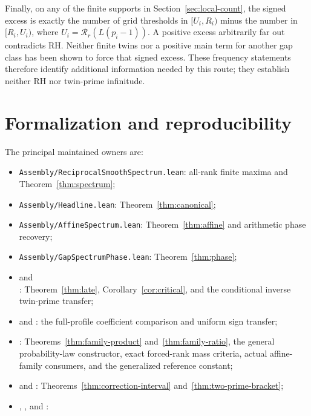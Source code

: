 \documentclass[11pt]{article}
\theoremstyle{definition}
\begin{document}
Finally, on any of the finite supports in Section~\ref{sec:local-count},
the signed excess is exactly the number of grid thresholds in
$[U_i,R_i)$ minus the number in $[R_i,U_i)$, where
$U_i=\mathcal R_r(L(p_i-1))$.
A positive excess arbitrarily far out contradicts RH.
Neither finite twins nor a positive main term for another gap class
has been shown to force that signed excess. These frequency statements
therefore identify additional information needed by this route;
they establish neither RH nor twin-prime infinitude.

\section{Formalization and reproducibility}\label{sec:formal}
The principal maintained owners are:
\begin{itemize}\small\raggedright
\item \texttt{Assembly/ReciprocalSmoothSpectrum.lean}:
all-rank finite maxima and Theorem~\ref{thm:spectrum};
\item \texttt{Assembly/Headline.lean}: Theorem~\ref{thm:canonical};
\item \texttt{Assembly/AffineSpectrum.lean}:
Theorem~\ref{thm:affine} and arithmetic phase recovery;
\item \texttt{Assembly/GapSpectrumPhase.lean}:
Theorem~\ref{thm:phase};
\item {} and\\
:
Theorem~\ref{thm:late}, Corollary~\ref{cor:critical}, and the
conditional inverse twin-prime transfer;
\item {} and
: the full-profile
coefficient comparison and uniform sign transfer;
\item {}:
Theorems~\ref{thm:family-product} and~\ref{thm:family-ratio},
the general probability-law constructor, exact forced-rank mass criteria,
actual affine-family consumers, and the generalized reference constant;
\item {} and
:
Theorems~\ref{thm:correction-interval} and~\ref{thm:two-prime-bracket};
\item {},
,
 and
:

\end{itemize}
\end{document}
